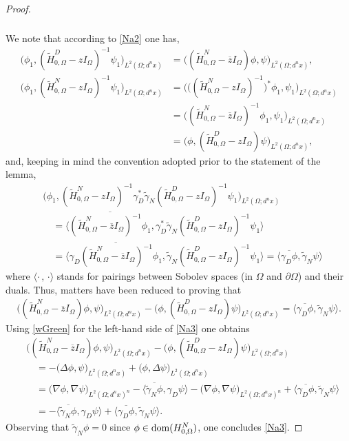 \documentclass[reqno,10pt, centertags]{amsart}
\newcommand{\no}{\nonumber}
\newcommand{\lb}{\label}
\newcommand{\ol}{\overline}
\newcommand{\wti}{\widetilde}
\newcommand{\ga}{\gamma}
\newcommand{\Om}{\Omega}
\newcommand{\dom}{\text{\rm{dom}}}
\numberwithin{equation}{section}
\theoremstyle{definition}
\begin{document}
\begin{proof}
\begin{align}
\begin{split}
\end{split}
\end{align}
We note that according to \eqref{Na2} one has,
\begin{align}
\big(\phi_1,(\wti H^D_{0,\Om}-zI_\Om)^{-1}\psi_1\big)_{L^2(\Om;d^nx)}
&= \big((\wti H^N_{0,\Om}-\ol{z}I_\Om)\phi,\psi\big)_{L^2(\Om;d^nx)},
\\
\big(\phi_1,(\wti H^N_{0,\Om}-zI_\Om)^{-1}\psi_1\big)_{L^2(\Om;d^nx)}
&= \big(\big((\wti H^N_{0,\Om}-zI_\Om)^{-1}\big)^*\phi_1,
\psi_1\big)_{L^2(\Om;d^nx)} \no
\\
&= \big((\wti H^N_{0,\Om}-\ol{z}I_\Om)^{-1}\phi_1,\psi_1\big)_{L^2(\Om;d^nx)}
\no
\\
&= \big(\phi,(\wti H^D_{0,\Om}-zI_\Om)\psi\big)_{L^2(\Om;d^nx)},
\end{align}
and, keeping in mind the convention adopted prior to the statement of the lemma,
\begin{align}
&\big(\phi_1,(\wti H^N_{0,\Om}-zI_\Om)^{-1}\ga_D^*\wti\gamma_N
(\wti H^D_{0,\Om}-zI_\Om)^{-1}\psi_1\big)_{L^2(\Om;d^nx)} \no
\\
&\quad =
\langle\ol{(\wti H^N_{0,\Om}-\ol{z}I_\Om)^{-1}\phi_1},\ga_D^*\wti\gamma_N
(\wti H^D_{0,\Om}-zI_\Om)^{-1}\psi_1\rangle \no
\\
&\quad = \big\langle\ol{\ga_D(\wti H^N_{0,\Om}-\ol{z}I_\Om)^{-1}\phi_1},
\wti\gamma_N (\wti H^D_{0,\Om}-zI_\Om)^{-1}\psi_1\big\rangle =
\big\langle\ol{\ga_D\phi},\wti\gamma_N\psi\big\rangle
\end{align}
where $\langle\cdot\,,\,\cdot\rangle$ stands for pairings
between Sobolev spaces (in $\Omega$ and $\partial\Omega$) and their duals.
Thus, matters have been reduced to proving that
\begin{align} \lb{Na3}
\big((\wti H^N_{0,\Om}-\ol{z}I_\Om)\phi,\psi\big)_{L^2(\Om;d^nx)} -
\big(\phi,(\wti H^D_{0,\Om}-zI_\Om)\psi\big)_{L^2(\Om;d^nx)} =
\big\langle\ol{\ga_D\phi},\wti\gamma_N\psi\big\rangle.
\end{align}
Using \eqref{wGreen} for the left-hand side of \eqref{Na3} one obtains
\begin{align}
&\big((\wti H^N_{0,\Om}-\ol{z}I_\Om)\phi,\psi\big)_{L^2(\Om;d^nx)} -
\big(\phi,(\wti H^D_{0,\Om}-zI_\Om)\psi\big)_{L^2(\Om;d^nx)} \no
\\
&\quad = -\big(\Delta\phi,\psi\big)_{L^2(\Om;d^nx)} +
\big(\phi,\Delta\psi\big)_{L^2(\Om;d^nx)}
\\
&\quad = \big(\nabla\phi,\nabla\psi\big)_{L^2(\Om;d^nx)^n} -
\big\langle\ol{\wti\gamma_N\phi},\ga_D\psi\big\rangle -
\big(\nabla\phi,\nabla\psi\big)_{L^2(\Om;d^nx)^n} +
\big\langle\ol{\ga_D\phi},\wti\gamma_N\psi\big\rangle \no
\\
&\quad = -\big\langle\ol{\wti\gamma_N\phi},\ga_D\psi\big\rangle +
\big\langle\ol{\ga_D\phi},\wti\gamma_N\psi\big\rangle. \no
\end{align}
Observing that $\wti\gamma_N\phi=0$ since $\phi\in\dom(H^N_{0,\Om})$,
one concludes \eqref{Na3}.
\end{proof}
\end{document}
